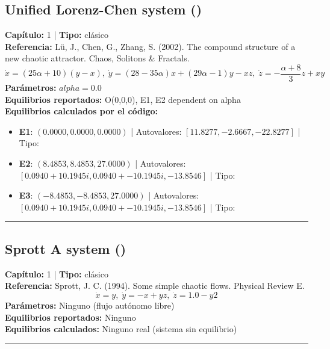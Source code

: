 \subsection*{Unified Lorenz-Chen system ()}
\textbf{Capítulo:} 1 | \textbf{Tipo:} clásico\\
\textbf{Referencia:} Lü, J., Chen, G., Zhang, S. (2002). The compound structure of a new chaotic attractor. Chaos, Solitons \& Fractals.\\
\[\dot{x}=(25\alpha+10)(y-x), \; \dot{y}=(28-35\alpha)x+(29\alpha-1)y-xz, \; \dot{z}=-\frac{\alpha+8}{3}z+xy\]
\textbf{Parámetros:} $alpha = 0.0$\\
\textbf{Equilibrios reportados:} O(0,0,0), E1, E2 dependent on alpha\\
\textbf{Equilibrios calculados por el código:}
\begin{itemize}
  \item \textbf{E1}: $(0.0000, 0.0000, 0.0000)$ | Autovalores: $[11.8277, -2.6667, -22.8277]$ | Tipo: 
  \item \textbf{E2}: $(8.4853, 8.4853, 27.0000)$ | Autovalores: $[0.0940 + 10.1945i, 0.0940 + -10.1945i, -13.8546]$ | Tipo: 
  \item \textbf{E3}: $(-8.4853, -8.4853, 27.0000)$ | Autovalores: $[0.0940 + 10.1945i, 0.0940 + -10.1945i, -13.8546]$ | Tipo: 
\end{itemize}
\hrule

\subsection*{Sprott A system ()}
\textbf{Capítulo:} 1 | \textbf{Tipo:} clásico\\
\textbf{Referencia:} Sprott, J. C. (1994). Some simple chaotic flows. Physical Review E.\\
\[\dot{x}=y, \; \dot{y}=-x+yz, \; \dot{z}=1.0-y2\]
\textbf{Parámetros:} Ninguno (flujo autónomo libre)\\
\textbf{Equilibrios reportados:} Ninguno\\
\textbf{Equilibrios calculados:} Ninguno real (sistema sin equilibrio)\\
\hrule

